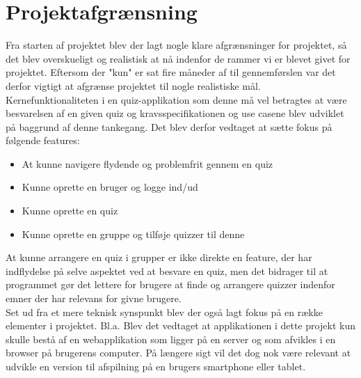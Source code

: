 \chapter{Projektafgrænsning}

Fra starten af projektet blev der lagt nogle klare afgrænsninger for projektet, så det blev overskueligt og realistisk at nå indenfor de rammer vi er blevet givet for projektet. Eftersom der "kun" er sat fire måneder af til gennemførslen var det derfor vigtigt at afgrænse projektet til nogle realistiske mål. \\
Kernefunktionaliteten i en quiz-applikation som denne må vel betragtes at være besvarelsen af en given quiz og kravsspecifikationen og use casene blev udviklet på baggrund af denne tankegang. Det blev derfor vedtaget at sætte fokus på følgende features:

\begin{itemize}
\item At kunne navigere flydende og problemfrit gennem en quiz
\item Kunne oprette en bruger og logge ind/ud
\item Kunne oprette en quiz
\item Kunne oprette en gruppe og tilføje quizzer til denne
\end{itemize}

At kunne arrangere en quiz i grupper er ikke direkte en feature, der har indflydelse på selve aspektet ved at besvare en quiz, men det bidrager til at programmet gør det lettere for brugere at finde og arrangere quizzer indenfor emner der har relevans for givne brugere.\\


Set ud fra et mere teknisk synspunkt blev der også lagt fokus på en række elementer i projektet. Bl.a. Blev det vedtaget at  applikationen i dette projekt kun skulle bestå af en webapplikation som ligger på en server og som afvikles i en browser på brugerens computer. På længere sigt vil det dog nok være relevant at udvikle en version til afspilning på en brugers smartphone eller tablet.
